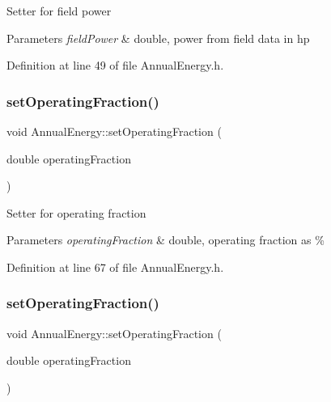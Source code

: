 Setter for field power 
\begin{DoxyParams}{Parameters}
{\em field\+Power} & double, power from field data in hp \\
\hline
\end{DoxyParams}


Definition at line 49 of file Annual\+Energy.\+h.

\mbox{\label{class_annual_energy_a5c127c7d5e2a5e4f50559f8b546e8998}} 
\subsubsection{\texorpdfstring{set\+Operating\+Fraction()}{setOperatingFraction()}\hspace{0.1cm}{\footnotesize\ttfamily [1/3]}}
{\footnotesize\ttfamily void Annual\+Energy\+::set\+Operating\+Fraction (\begin{DoxyParamCaption}\item[{double}]{operating\+Fraction }\end{DoxyParamCaption})\hspace{0.3cm}{\ttfamily [inline]}}

Setter for operating fraction


\begin{DoxyParams}{Parameters}
{\em operating\+Fraction} & double, operating fraction as \% \\
\hline
\end{DoxyParams}


Definition at line 67 of file Annual\+Energy.\+h.

\mbox{\label{class_annual_energy_a5c127c7d5e2a5e4f50559f8b546e8998}} 
\subsubsection{\texorpdfstring{set\+Operating\+Fraction()}{setOperatingFraction()}\hspace{0.1cm}{\footnotesize\ttfamily [2/3]}}
{\footnotesize\ttfamily void Annual\+Energy\+::set\+Operating\+Fraction (\begin{DoxyParamCaption}\item[{double}]{operating\+Fraction }\end{DoxyParamCaption})\hspace{0.3cm}{\ttfamily [inline]}}

